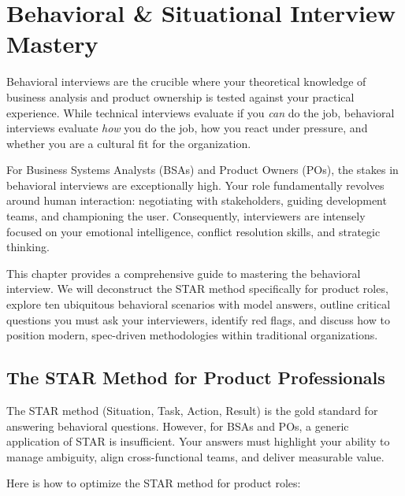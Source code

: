 \documentclass[
  11pt,
  openany,
  oneside]{book}
\begin{document}
\chapter{Behavioral \& Situational Interview
Mastery}\label{behavioral-situational-interview-mastery}

Behavioral interviews are the crucible where your theoretical knowledge
of business analysis and product ownership is tested against your
practical experience. While technical interviews evaluate if you
\emph{can} do the job, behavioral interviews evaluate \emph{how} you do
the job, how you react under pressure, and whether you are a cultural
fit for the organization.

For Business Systems Analysts (BSAs) and Product Owners (POs), the
stakes in behavioral interviews are exceptionally high. Your role
fundamentally revolves around human interaction: negotiating with
stakeholders, guiding development teams, and championing the user.
Consequently, interviewers are intensely focused on your emotional
intelligence, conflict resolution skills, and strategic thinking.

This chapter provides a comprehensive guide to mastering the behavioral
interview. We will deconstruct the STAR method specifically for product
roles, explore ten ubiquitous behavioral scenarios with model answers,
outline critical questions you must ask your interviewers, identify red
flags, and discuss how to position modern, spec-driven methodologies
within traditional organizations.

\bigskip

\section{The STAR Method for Product
Professionals}\label{the-star-method-for-product-professionals}

The STAR method (Situation, Task, Action, Result) is the gold standard
for answering behavioral questions. However, for BSAs and POs, a generic
application of STAR is insufficient. Your answers must highlight your
ability to manage ambiguity, align cross-functional teams, and deliver
measurable value.

Here is how to optimize the STAR method for product roles:
\end{document}
